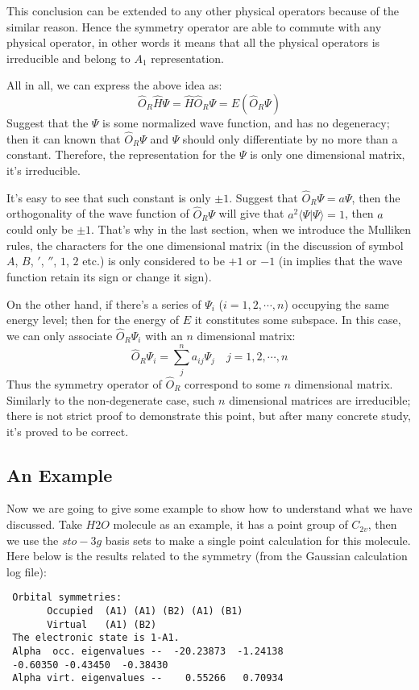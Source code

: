 This conclusion can be extended to any other physical operators because of the
similar reason. Hence the symmetry operator are able to commute with any
physical operator, in other words it means that all the physical operators is
irreducible and belong to $A_{1}$ representation.

All in all, we can express the above idea as:
\begin{equation}\label{GROUPeq:6}
  \hat{O}_{R}\hat{H}\Psi = \hat{H}\hat{O}_{R}\Psi = E(\hat{O}_{R}\Psi)
\end{equation}
Suggest that the $\Psi$ is some normalized wave function, and has no
degeneracy; then it can known that $\hat{O}_{R}\Psi$ and $\Psi$ should
only differentiate by no more than a constant. Therefore, the
representation for the $\Psi$ is only one dimensional matrix, it's
irreducible.

It's easy to see that such constant is only $\pm 1$. Suggest that
$\hat{O}_{R}\Psi = a\Psi$, then the orthogonality of the wave function
of $\hat{O}_{R}\Psi$ will give that $a^{2}\langle\Psi|\Psi\rangle =
1$, then $a$ could only be $\pm 1$.  That's why in the last section,
when we introduce the Mulliken rules, the characters for the one
dimensional matrix (in the discussion of symbol $A$, $B$, $'$, $''$,
$1$, $2$ etc.) is only considered to be $+1$ or $-1$ (in implies that the wave
function retain its sign or change it sign).

On the other hand, if there's a series of $\Psi_{i}$
($i=1,2,\cdots,n$) occupying the same energy level; then for the
energy of $E$ it constitutes some subspace. In this case, we can only
associate $\hat{O}_{R}\Psi_{i}$ with an $n$ dimensional matrix:
\begin{equation}\label{}
  \hat{O}_{R}\Psi_{i} = \sum_{j}^{n}a_{ij}\Psi_{j} \quad
  j=1,2,\cdots,n
\end{equation}
Thus the symmetry operator of $\hat{O}_{R}$ correspond to some $n$
dimensional matrix. Similarly to the non-degenerate case, such $n$
dimensional matrices are irreducible; there is not strict proof to
demonstrate this point, but after many concrete study, it's proved to
be correct\cite{XingLinKe}.



\subsection{An Example}
%
%  
%
Now we are going to give some example to show how to understand what
we have discussed. Take $H2O$ molecule as an example, it has a point
group of $C_{2v}$, then we use the $sto-3g$ basis sets to make a
single point calculation for this molecule. Here below is the results
related to the symmetry (from the Gaussian calculation log file):
\begin{center}
\begin{verbatim}
 Orbital symmetries:
       Occupied  (A1) (A1) (B2) (A1) (B1)
       Virtual   (A1) (B2)
 The electronic state is 1-A1.
 Alpha  occ. eigenvalues --  -20.23873  -1.24138
 -0.60350 -0.43450  -0.38430
 Alpha virt. eigenvalues --    0.55266   0.70934
\end{verbatim}
\end{center}

